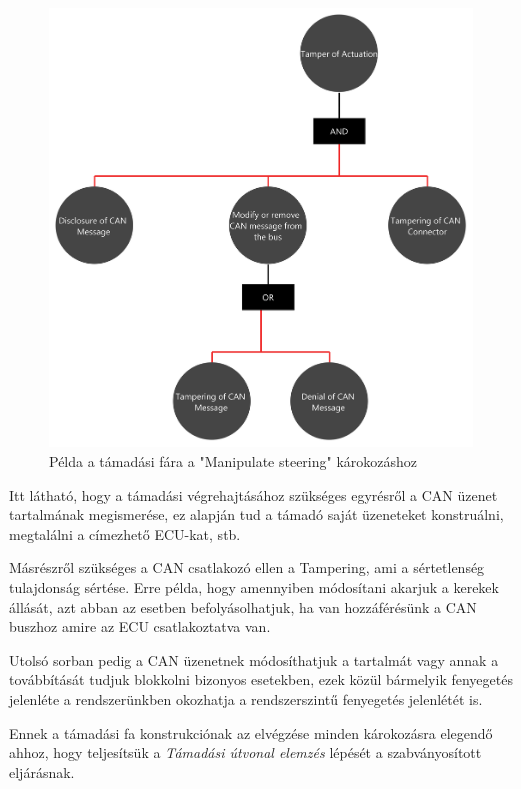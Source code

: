 \begin{figure}[!ht]
	\centering
	\includegraphics[width=130mm, keepaspectratio]{figures/04_attack_tree.png}
	\caption{Példa a támadási fára a "Manipulate steering" károkozáshoz}
	\label{fig:04_attack_tree}
\end{figure} 

Itt látható, hogy a támadási végrehajtásához szükséges egyrésről a CAN üzenet tartalmának megismerése, ez alapján tud a támadó saját üzeneteket konstruálni, megtalálni a címezhető ECU-kat, stb. 

Másrészről szükséges a CAN csatlakozó ellen a Tampering, ami a sértetlenség tulajdonság sértése. Erre példa, hogy amennyiben módosítani akarjuk a kerekek állását, azt abban az esetben befolyásolhatjuk, ha van hozzáférésünk a CAN buszhoz amire az ECU csatlakoztatva van.

Utolsó sorban pedig a CAN üzenetnek módosíthatjuk a tartalmát vagy annak a továbbítását tudjuk blokkolni bizonyos esetekben, ezek közül bármelyik fenyegetés jelenléte a rendszerünkben okozhatja a rendszerszintű fenyegetés jelenlétét is.

Ennek a támadási fa konstrukciónak az elvégzése minden károkozásra elegendő ahhoz, hogy teljesítsük a \textit{Támadási útvonal elemzés} lépését a szabványosított eljárásnak. 

